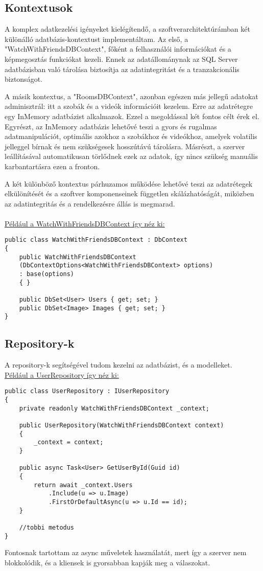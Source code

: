 \subsection*{Kontextusok}
A komplex adatkezelési igényeket kielégítendő, a szoftverarchitektúrámban két különálló adatbázis-kontextust implementáltam. Az első, a "WatchWithFriendsDBContext", főként a felhasználói információkat és a képmegosztás funkciókat kezeli. Ennek az adatállománynak az SQL Server adatbázisban való tárolása biztosítja az adatintegritást és a tranzakcionális biztonságot.

A másik kontextus, a "RoomsDBContext", azonban egészen más jellegű adatokat adminisztrál: itt a szobák és a videók információit kezelem. Erre az adatrétegre egy InMemory adatbázist alkalmazok. Ezzel a megoldással két fontos célt érek el. Egyrészt, az InMemory adatbázis lehetővé teszi a gyors és rugalmas adatmanipulációt, optimális azokhoz a szobákhoz és videókhoz, amelyek volatilis jelleggel bírnak és nem szükségesek hosszútávú tárolásra. Másrészt, a szerver leállításával automatikusan törlődnek ezek az adatok, így nincs szükség manuális karbantartásra ezen a fronton.

A két különböző kontextus párhuzamos működése lehetővé teszi az adatrétegek elkülönítését és a szoftver komponenseinek független skálázhatóságát, miközben az adatintegritás és a rendelkezésre állás is megmarad.
\\
\\
\underline{Például a WatchWithFriendsDBContext így néz ki:}
\begin{lstlisting}[language=CSharp,style=CSharpBase]
public class WatchWithFriendsDBContext : DbContext
{
    public WatchWithFriendsDBContext
    (DbContextOptions<WatchWithFriendsDBContext> options) 
    : base(options)
    { }

    public DbSet<User> Users { get; set; }
    public DbSet<Image> Images { get; set; }
}
\end{lstlisting}
\subsection*{Repository-k}
A repository-k segítségével tudom kezelni az adatbázist, és a modelleket.
\\
\underline{Például a UserRepository így néz ki:}
\begin{lstlisting}[language=CSharp,style=CSharpBase]
public class UserRepository : IUserRepository
{
    private readonly WatchWithFriendsDBContext _context;

    public UserRepository(WatchWithFriendsDBContext context)
    {
        _context = context;
    }

    public async Task<User> GetUserById(Guid id)
    {
        return await _context.Users
            .Include(u => u.Image)
            .FirstOrDefaultAsync(u => u.Id == id);
    }

    //tobbi metodus
}
\end{lstlisting}
Fontosnak tartottam az async műveletek használatát, mert így a szerver nem blokkolódik, és a kliensek is gyorsabban kapják meg a válaszokat.
